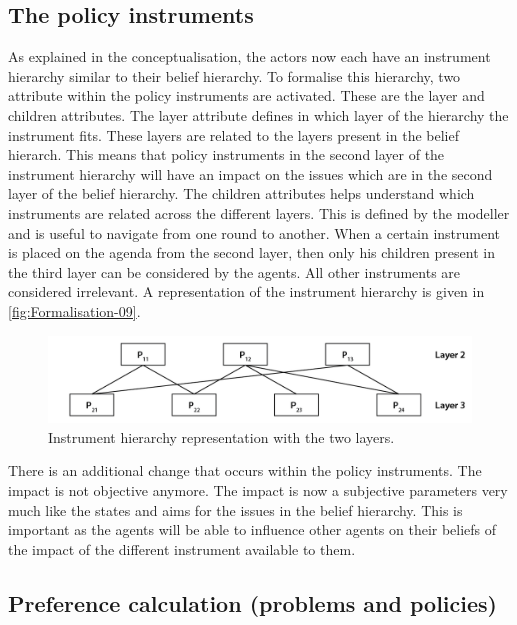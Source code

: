 \subsection{The policy instruments}

As explained in the conceptualisation, the actors now each have an instrument hierarchy similar to their belief hierarchy. To formalise this hierarchy, two attribute within the policy instruments are activated. These are the layer and children attributes. The layer attribute defines in which layer of the hierarchy the instrument fits. These layers are related to the layers present in the belief hierarch. This means that policy instruments in the second layer of the instrument hierarchy will have an impact on the issues which are in the second layer of the belief hierarchy. The children attributes helps understand which instruments are related across the different layers. This is defined by the modeller and is useful to navigate from one round to another. When a certain instrument is placed on the agenda from the second layer, then only his children present in the third layer can be considered by the agents. All other instruments are considered irrelevant. A representation of the instrument hierarchy is given in \autoref{fig:Formalisation-09}.

\begin{figure}
\centering
\includegraphics[scale = 0.75, angle = 0]{figures/Formalisation-09}
\caption{Instrument hierarchy representation with the two layers.}
\label{fig:Formalisation-09}
\end{figure}

There is an additional change that occurs within the policy instruments. The impact is not objective anymore. The impact is now a subjective parameters very much like the states and aims for the issues in the belief hierarchy. This is important as the agents will be able to influence other agents on their beliefs of the impact of the different instrument available to them.

\subsection{Preference calculation (problems and policies)}

